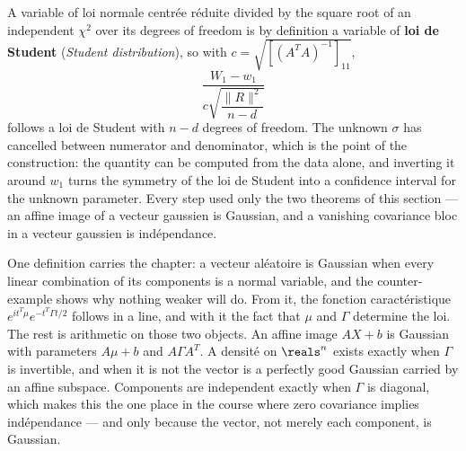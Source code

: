 \begin{example}
A variable of loi normale centrée réduite divided by the square root of an
independent $\chi^{2}$ over its degrees of freedom is by definition a variable of
\textbf{loi de Student} (\textit{Student distribution}), so
with $c = \sqrt{[(A^{T}A)^{-1}]_{11}}$,
\[
  \frac{W_{1} - w_{1}}{c\sqrt{\dfrac{\|R\|^{2}}{n-d}}}
\]
follows a loi de Student with $n-d$ degrees of freedom. The unknown
$\sigma$ has cancelled between numerator and denominator, which is the point of
the construction: the quantity can be computed from the data alone, and inverting
it around $w_{1}$ turns the symmetry of the loi de Student into a confidence
interval for the unknown parameter. Every step used only the two theorems of this
section --- an affine image of a vecteur gaussien is Gaussian, and a vanishing
covariance bloc in a vecteur gaussien is indépendance.
\end{example}

\begin{conclusion}
One definition carries the chapter: a vecteur aléatoire is Gaussian when every
linear combination of its components is a normal variable, and the counter-example
shows why nothing weaker will do. From it, the fonction caractéristique
$e^{it^{T}\mu}e^{-t^{T}\Gamma t/2}$ follows in a line, and with it the fact that
$\mu$ and $\Gamma$ determine the loi. The rest is arithmetic on those two
objects. An affine image $AX + b$ is Gaussian with parameters $A\mu + b$ and
$A\Gamma A^{T}$. A densité on $\reals^{n}$ exists exactly when $\Gamma$ is
invertible, and when it is not the vector is a perfectly good Gaussian carried by
an affine subspace. Components are independent exactly when $\Gamma$ is diagonal,
which makes this the one place in the course where zero covariance implies
indépendance --- and only because the vector, not merely each component, is
Gaussian.
\end{conclusion}
